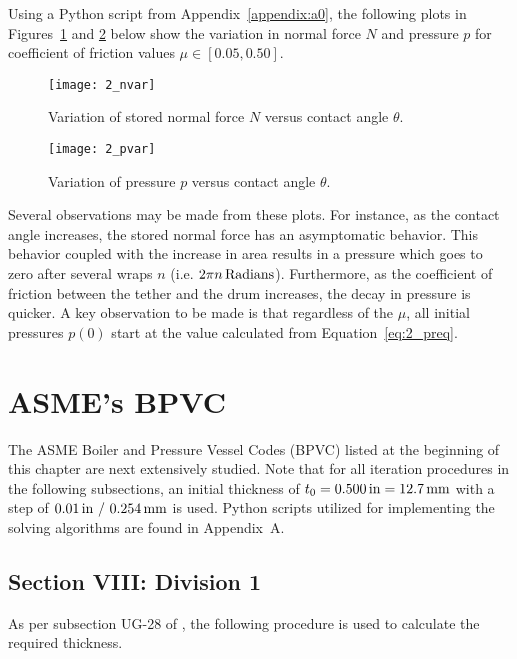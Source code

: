 Using a Python script \cite{PYTHON} from Appendix~\ref{appendix:a0}, the following plots in Figures~\ref{fig:2_nvar} and \ref{fig:2_pvar} below show the variation in normal force $N$ and pressure $p$ for coefficient of friction values $\mu \in [0.05, 0.50]$.

\begin{figure}[H]
	\centering
	\texttt{[image: 2\_nvar]}
	\caption{Variation of stored normal force $N$ versus contact angle $\theta$.}
	\label{fig:2_nvar}
\end{figure}

\begin{figure}[H]
	\centering
	\texttt{[image: 2\_pvar]}
	\caption{Variation of pressure $p$ versus contact angle $\theta$.}
	\label{fig:2_pvar}
\end{figure}

Several observations may be made from these plots. For instance, as the contact angle increases, the stored normal force has an asymptomatic behavior. This behavior coupled with the increase in area results in a pressure which goes to zero after several wraps $n$ (i.e. $2 \pi n \,\mathrm{Radians}$). Furthermore, as the coefficient of friction between the tether and the drum increases, the decay in pressure is quicker. A key observation to be made is that regardless of the $\mu$, all initial pressures $p(0)$ start at the value calculated from Equation~\ref{eq:2_preq}.  

\section{ASME's BPVC}

The ASME Boiler and Pressure Vessel Codes (BPVC) listed at the beginning of this chapter are next extensively studied. Note that for all iteration procedures in the following subsections, an initial thickness of $t_0 =0.500\,\mathrm{in}= 12.7 \,\mathrm{mm}$ with a step of  $0.01\,\mathrm{in} \ / \ 0.254\,\mathrm{mm}$ is used. Python scripts \cite{PYTHON} utilized for implementing the solving algorithms are found in Appendix~A. 
\subsection{Section VIII: Division 1}
\label{section:2_VIII1}
As per subsection UG-28 of \cite{ASMEbvpcVII1}, the following procedure is used to calculate the required thickness.

